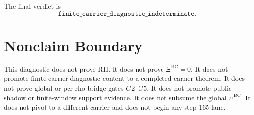 \documentclass[11pt]{article}
\begin{document}
The final verdict is
\[
  \boxed{\texttt{finite\_carrier\_diagnostic\_indeterminate}.}
\]

\section*{Nonclaim Boundary}

This diagnostic does not prove RH. It does not prove
\(\Xi^{\mathrm{BC}}=0\). It does not promote finite-carrier diagnostic content
to a completed-carrier theorem. It does not prove global or per-rho bridge
gates \(G2\)--\(G5\). It does not promote public-shadow or finite-window
support evidence. It does not subsume the global \(\Xi^{\mathrm{BC}}\). It
does not pivot to a different carrier and does not begin any step 165 lane.
\end{document}
